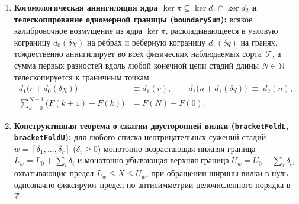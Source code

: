\begin{enumerate}[label=\textbf{\arabic*.},leftmargin=*]
\begin{equation}
  \end{equation}
  Индуктивная свёртка любого конечного слова стадий $w = [s_1, \dots, s_r]$ вдоль действия $\mathrm{step} : \Sigma \to \mathcal{M} \to \mathcal{M}$, сохраняющего проекцию ($\forall s\in\Sigma,\ \pi(\mathrm{step}(s, x)) = \pi(x)$), удовлетворяет закону моноида $\mathrm{stageFold}(w_1\mathbin{+\!+}w_2, x) = \mathrm{stageFold}(w_2, \mathrm{stageFold}(w_1, x))$ и тождественно сохраняет наблюдаемую $\pi(\mathrm{stageFold}(w, x)) = \pi(x)$, а для любой проективной системы гомоморфизмов $\pi_n : M_{n+1} \to M_n$ ($\mathrm{obs}_{n+1}(x) = \mathrm{obs}_n(\pi_n(x))$) композиция проекций на базовый носитель $\Pi_{n\to 0} : M_n \to M_0$ стабилизирует все макроскопические наблюдаемые на любом этаже~$n\in\mathbb{N}$:
  \begin{equation}
    \label{eq:mono-tower-stabilization}
    \mathrm{obs}_0\bigl(\Pi_{n\to 0}(x_n)\bigr) \;=\; \mathrm{obs}_n(x_n) \qquad \forall\,n\in\mathbb{N},\ \forall\,x_n\in M_n.
  \end{equation}
\item \textbf{Когомологическая аннигиляция ядра $\ker\pi \subseteq \ker d_1 \cap \ker d_2$ и телескопирование одномерной границы (\texttt{boundarySum}):}
  всякое калибровочное возмущение из ядра $\ker\pi$, раскладывающееся в узловую кограницу $d_0(\delta\chi)$ на рёбрах и рёберную кограницу $d_1(\delta q)$ на гранях, тождественно аннигилирует во всех физических наблюдаемых сорта~$\mathcal{T}$, а сумма первых разностей вдоль любой конечной цепи стадий длины $N\in\mathbb{N}$ телескопируется к граничным точкам:
  \begin{align}
    d_1\bigl(r + d_0(\delta\chi)\bigr) &\equiv d_1(r), \qquad
    d_2\bigl(n + d_1(\delta q)\bigr) \;\equiv\; d_2(n), \label{eq:mono-kernel-annihilation} \\
    \sum_{k=0}^{N-1}\bigl(F(k+1) - F(k)\bigr) &= F(N) - F(0). \label{eq:mono-boundary-telescoping}
  \end{align}
\item \textbf{Конструктивная теорема о сжатии двусторонней вилки (\texttt{bracket\allowbreak FoldL}, \texttt{bracket\allowbreak FoldU}):}
  для любого списка неотрицательных сужений стадий $w = [\delta_1, \dots, \delta_r]$ ($\delta_i \ge 0$) монотонно возрастающая нижняя граница $L_w = L_0 + \sum_i \delta_i$ и монотонно убывающая верхняя граница $U_w = U_0 - \sum_i \delta_i$, охватывающие предел $L_w \le X \le U_w$, при обращении ширины вилки в нуль однозначно фиксируют предел по антисимметрии целочисленного порядка в~$\mathbb{Z}$:
  \begin{equation}

\end{equation}
\end{enumerate}
